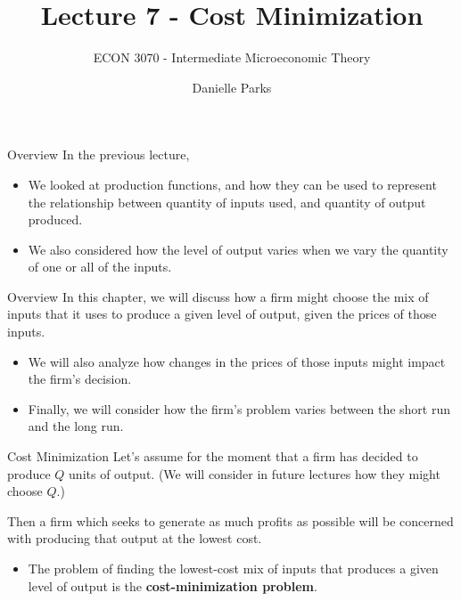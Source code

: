 \documentclass{beamer}
\author{Danielle Parks}
\title{Lecture 7  - Cost Minimization}
\subtitle{ECON 3070 - Intermediate Microeconomic Theory}
\begin{document}
\begin{frame}
  \titlepage
\end{frame}

\begin{frame}{Overview}
  In the previous lecture,

  \begin{itemize}
    \item We looked at production functions, and how they can be used to represent the relationship between quantity of inputs used, and quantity of output produced.

    \item We also considered how the level of output varies when we vary the quantity of one or all of the inputs.
  \end{itemize}
\end{frame}

\begin{frame}{Overview}
  In this chapter, we will discuss how a firm might choose the mix of inputs that it uses to produce a given level of output, given the prices of those inputs.

  \begin{itemize}
    \item We will also analyze how changes in the prices of those inputs might impact the firm's decision.

    \item Finally, we will consider how the firm's problem varies between the short run and the long run.
  \end{itemize}
\end{frame}


\begin{frame}{Cost Minimization}
  Let's assume for the moment that a firm has decided to produce $Q$ units of output. (We will consider in future lectures how they might choose $Q$.)

  \bigskip
  Then a firm which seeks to generate as much profits as possible will be concerned with producing that output at the lowest cost.

  \bigskip
  \begin{itemize}
    \item The problem of finding the lowest-cost mix of inputs that produces a given level of output is the \textbf{cost-minimization problem}.
  \end{itemize}
\end{frame}
\end{document}
